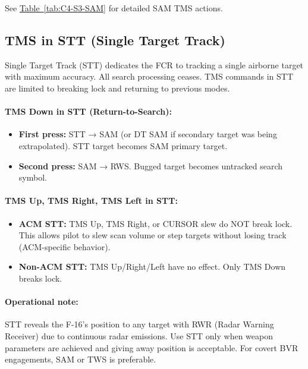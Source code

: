 \documentclass[11pt, a4paper, twoside]{report}
\newcommand{\tabref}[1]{\hyperref[#1]{Table~\ref*{#1}}}
\begin{document}
See \tabref{tab:C4-S3-SAM} for detailed SAM TMS actions.

\subsection{TMS in STT (Single Target Track)}
\label{sec:C4-S3-S2}

Single Target Track (STT) dedicates the FCR to tracking a single airborne target with maximum accuracy. All search processing ceases. TMS commands in STT are limited to breaking lock and returning to previous modes.

\paragraph{TMS Down in STT (Return-to-Search):}
\begin{itemize}
    \item \textbf{First press:} STT → SAM (or DT SAM if secondary target was being extrapolated). STT target becomes SAM primary target.
    \item \textbf{Second press:} SAM → RWS. Bugged target becomes untracked search symbol.
\end{itemize}

\paragraph{TMS Up, TMS Right, TMS Left in STT:}
\begin{itemize}
    \item \textbf{ACM STT:} TMS Up, TMS Right, or CURSOR slew do NOT break lock. This allows pilot to slew scan volume or step targets without losing track (ACM-specific behavior).
    \item \textbf{Non-ACM STT:} TMS Up/Right/Left have no effect. Only TMS Down breaks lock.
\end{itemize}

\paragraph{Operational note:}
STT reveals the F-16's position to any target with RWR (Radar Warning Receiver) due to continuous radar emissions. Use STT only when weapon parameters are achieved and giving away position is acceptable. For covert BVR engagements, SAM or TWS is preferable.
\end{document}
